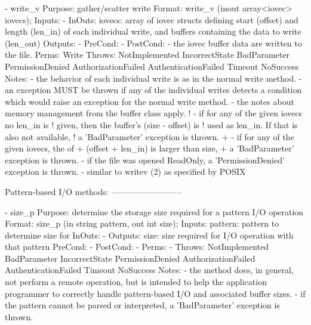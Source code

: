 \begin{myspec}
 
    - write_v
      Purpose:  gather/scatter write
      Format:   write_v            (inout  array<iovec> iovecs);
      Inputs:   -
      InOuts:   iovecs:             array of iovec structs
                                    defining start (offset) and
                                    length (len_in) of each
                                    individual write, and
                                    buffers containing the data
                                    to write (len_out)
      Outputs:  -
      PreCond:  -
      PostCond: - the iovec buffer data are written to the file.
      Perms:    Write
      Throws:   NotImplemented
                IncorrectState
                BadParameter
                PermissionDenied
                AuthorizationFailed
                AuthenticationFailed
                Timeout
                NoSuccess
      Notes:    - the behavior of each individual write is as
                  in the normal write method.
                - an exception MUST be thrown if any of the
                  individual writes detects a condition which
                  would raise an exception for the normal write
                  method.
                - the notes about memory management from the
                  buffer class apply.
!               - if for any of the given iovecs no len_in is
!                 given, then the buffer's (size - offset) is 
!                 used as len_in.  If that is also not available,
!                 a 'BadParameter' exception is thrown.
+               - if for any of the given iovecs, the of 
+                 (offset + len_in) is larger than size,  
+                 a 'BadParameter' exception is thrown.
                - if the file was opened ReadOnly, a
                  'PermissionDenied' exception is thrown.
                - similar to writev (2) as specified by POSIX
 
 
    Pattern-based I/O methods:
    --------------------------
 
    - size_p
      Purpose:  determine the storage size required for a
                pattern I/O operation
      Format:   size_p             (in  string  pattern,
                                    out int     size);
      Inputs:   pattern:            pattern to determine size for
      InOuts:   -
      Outputs:  size:               size required for I/O
                                    operation with that pattern
      PreCond:  -
      PostCond: -
      Perms:    - 
      Throws:   NotImplemented
                BadParameter
                IncorrectState
                PermissionDenied
                AuthorizationFailed
                AuthenticationFailed
                Timeout
                NoSuccess
      Notes:    - the method does, in general, not perform a
                  remote operation, but is intended to help
                  the application programmer to correctly handle 
                  pattern-based I/O and associated buffer sizes.
                - if the pattern cannot be parsed or interpreted,
                  a 'BadParameter' exception is thrown.
 

\end{myspec}
